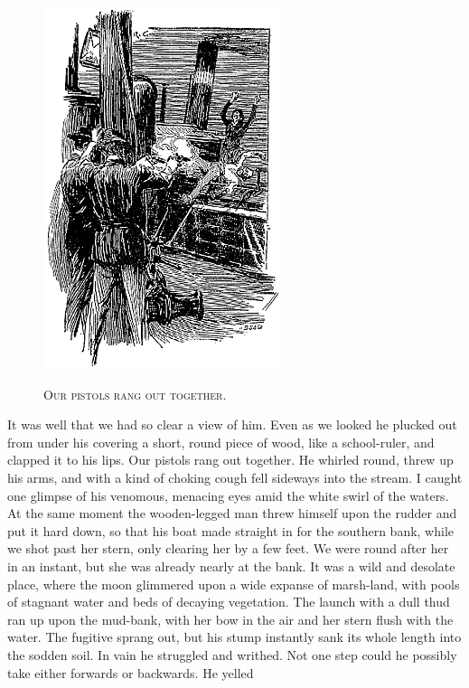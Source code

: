 \documentclass[12pt,english,oneside]{book}
\newcommand{\noun}[1]{\textsc{#1}}
\begin{document}
%
\begin{figure}[htbp]
\noindent \begin{center}\includegraphics{images/sign410-sign-17.png}\end{center}

\noindent \begin{center}\noun{Our pistols rang out together.}\end{center}
\end{figure}
It was well that we had so clear a view of him. Even as we looked
he plucked out from under his covering a short, round piece of wood,
like a school-ruler, and clapped it to his lips. Our pistols rang
out together. He whirled round, threw up his arms, and with a kind
of choking cough fell sideways into the stream. I caught one glimpse
of his venomous, menacing eyes amid the white swirl of the waters.
At the same moment the wooden-legged man threw himself upon the rudder
and put it hard down, so that his boat made straight in for the southern
bank, while we shot past her stern, only clearing her by a few feet.
We were round after her in an instant, but she was already nearly
at the bank. It was a wild and desolate place, where the moon glimmered
upon a wide expanse of marsh-land, with pools of stagnant water and
beds of decaying vegetation. The launch with a dull thud ran up upon
the mud-bank, with her bow in the air and her stern flush with the
water. The fugitive sprang out, but his stump instantly sank its whole
length into the sodden soil. In vain he struggled and writhed. Not
one step could he possibly take either forwards or backwards. He yelled
\end{document}
